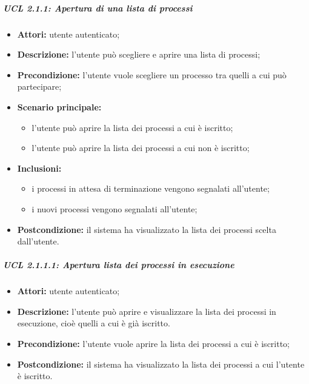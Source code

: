 \subparagraph{UCL 2.1.1: Apertura di una lista di processi}
\begin{itemize}
\item \textbf{Attori:} utente autenticato;
\item \textbf{Descrizione:} l'utente può scegliere e aprire una lista di processi;
\item \textbf{Precondizione:} l'utente vuole scegliere un processo tra quelli a cui può partecipare;
\item \textbf{Scenario principale:}
\begin{itemize}
\item l'utente può aprire la lista dei processi a cui è iscritto;
\item l'utente può aprire la lista dei processi a cui non è iscritto;
\end{itemize}
\item \textbf{Inclusioni:}
\begin{itemize}
\item i processi in attesa di terminazione vengono segnalati all'utente;
\item i nuovi processi vengono segnalati all'utente;
\end{itemize}
\item \textbf{Postcondizione:} il sistema ha visualizzato la lista dei processi scelta dall'utente.
\end{itemize}

\subparagraph{UCL 2.1.1.1: Apertura lista dei processi in esecuzione}
\begin{itemize}
\item \textbf{Attori:} utente autenticato;
\item \textbf{Descrizione:} l'utente può aprire e visualizzare la lista dei processi in esecuzione, cioè quelli a cui è già iscritto. 
\item \textbf{Precondizione:} l'utente vuole aprire la lista dei processi a cui è iscritto;
\item \textbf{Postcondizione:} il sistema ha visualizzato la lista dei processi a cui l'utente è iscritto.
\end{itemize}

